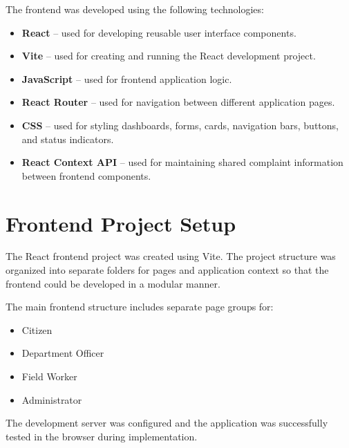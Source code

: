 \documentclass[12pt,a4paper]{article}
\begin{document}
The frontend was developed using the following technologies:

\begin{itemize}
    \item \textbf{React} -- used for developing reusable user interface
    components.
    
    \item \textbf{Vite} -- used for creating and running the React
    development project.
    
    \item \textbf{JavaScript} -- used for frontend application logic.
    
    \item \textbf{React Router} -- used for navigation between different
    application pages.
    
    \item \textbf{CSS} -- used for styling dashboards, forms, cards,
    navigation bars, buttons, and status indicators.
    
    \item \textbf{React Context API} -- used for maintaining shared complaint
    information between frontend components.
\end{itemize}

\section{Frontend Project Setup}

The React frontend project was created using Vite. The project structure was
organized into separate folders for pages and application context so that the
frontend could be developed in a modular manner.

The main frontend structure includes separate page groups for:

\begin{itemize}
    \item Citizen
    \item Department Officer
    \item Field Worker
    \item Administrator
\end{itemize}

The development server was configured and the application was successfully
tested in the browser during implementation.

\end{document}
